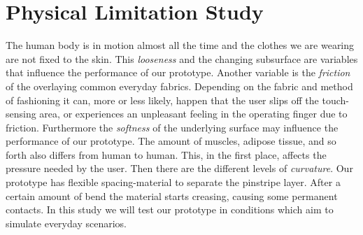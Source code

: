 \section{Physical Limitation Study}
The human body is in motion almost all the time and the clothes we are wearing are not fixed to the skin. This \emph{looseness} and the changing subsurface are variables that influence the performance of our prototype. Another variable is the \emph{friction} of the overlaying common everyday fabrics. Depending on the fabric and method of fashioning it can, more or less likely, happen that the user slips off the touch-sensing area, or experiences an unpleasant feeling in the operating finger due to friction. Furthermore the \emph{softness} of the underlying surface may influence the performance of our prototype. The amount of muscles, adipose tissue, and so forth also differs from human to human. This, in the first place, affects the pressure needed by the user. Then there are the different levels of \emph{curvature}. Our prototype has flexible spacing-material to separate the pinstripe layer. After a certain amount of bend the material starts creasing, causing some permanent contacts. In this study we will test our prototype in conditions which aim to simulate everyday scenarios.

